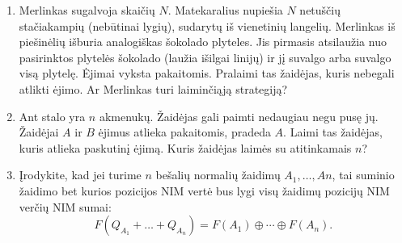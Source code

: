 \begin{enumerate}


  \item Merlinkas sugalvoja skaičių $N$. Matekaralius nupiešia $N$
    netuščių stačiakampių (nebūtinai lygių), sudarytų iš vienetinių langelių.
    Merlinkas iš piešinėlių išburia analogiškas šokolado plyteles.
    Jis pirmasis atsilaužia nuo pasirinktos plytelės šokolado (laužia išilgai
    linijų) ir jį suvalgo arba suvalgo visą plytelę. Ėjimai vyksta
    pakaitomis. Pralaimi tas žaidėjas, kuris nebegali atlikti ėjimo.  Ar
    Merlinkas turi laiminčiąją strategiją?  

  \item Ant stalo yra $n$ akmenukų. Žaidėjas gali paimti nedaugiau negu pusę
    jų. Žaidėjai $A$ ir $B$ ėjimus atlieka pakaitomis, pradeda $A$.  Laimi
    tas žaidėjas, kuris atlieka paskutinį ėjimą. Kuris žaidėjas laimės su
    atitinkamais $n$?

  \item Įrodykite, kad jei turime $n$ bešalių normalių žaidimų $A_{1},
    \ldots, A{n}$, tai suminio žaidimo bet kurios pozicijos NIM vertė bus
    lygi visų žaidimų pozicijų NIM verčių NIM sumai: $$F(Q_{A_{1}} + \ldots
    + Q_{A_{n}}) = F(A_{1}) \oplus \cdots \oplus F(A_{n}).$$


\end{enumerate}
